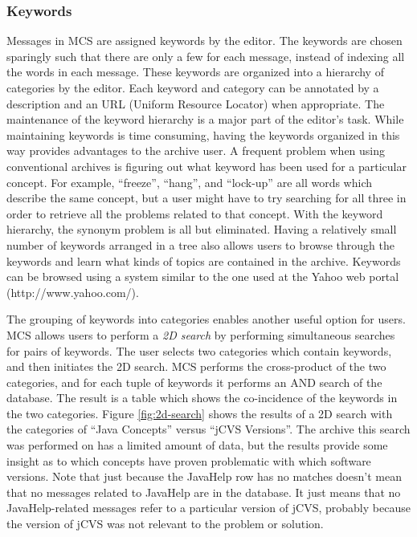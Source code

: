 \subsubsection{Keywords}
Messages in MCS are assigned keywords by the editor. The keywords are chosen
sparingly such that there are only a few for each message, instead of indexing
all the words in each message. These keywords are organized into a hierarchy of
categories by the editor. Each keyword and category can be annotated by a
description and an URL (Uniform Resource Locator) when appropriate. The
maintenance of the keyword hierarchy is a major part of the editor's task.
While maintaining keywords is time consuming, having the keywords organized in
this way provides advantages to the archive user. A frequent problem when using
conventional archives is figuring out what keyword has been used for a
particular concept. For example, ``freeze'', ``hang'', and ``lock-up'' are all
words which describe the same concept, but a user might have to try searching
for all three in order to retrieve all the problems related to that concept.
With the keyword hierarchy, the synonym problem is all but eliminated. Having a
relatively small number of keywords arranged in a tree also allows users to
browse through the keywords and learn what kinds of topics are contained in the
archive. Keywords can be browsed using a system similar to the one used at the
Yahoo web portal (http://www.yahoo.com/).


The grouping of keywords into categories enables another useful option for
users. MCS allows users to perform a {\em 2D search} by performing simultaneous
searches for pairs of keywords. The user selects two categories which contain
keywords, and then initiates the 2D search. MCS performs the cross-product of
the two categories, and for each tuple of keywords it performs an AND search of
the database. The result is a table which shows the co-incidence of the
keywords in the two categories. Figure \ref{fig:2d-search} shows the results of
a 2D search with the categories of ``Java Concepts'' versus ``jCVS Versions''.
The archive this search was performed on has a limited amount of data, but the
results provide some insight as to which concepts have proven problematic with
which software versions. Note that just because the JavaHelp row has no matches
doesn't mean that no messages related to JavaHelp are in the database. It just
means that no JavaHelp-related messages refer to a particular version of jCVS,
probably because the version of jCVS was not relevant to the problem or
solution.

